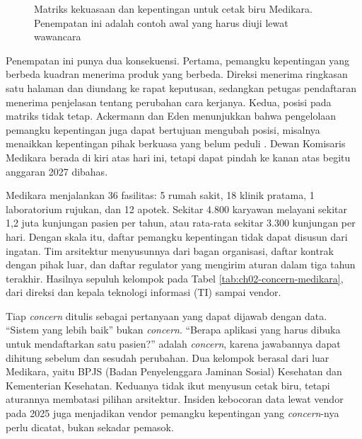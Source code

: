 \begin{figure}[!htb]
  \centering
  
  \caption{Matriks kekuasaan dan kepentingan untuk cetak biru Medikara.
           Penempatan ini adalah contoh awal yang harus diuji lewat
           wawancara}
  \label{fig:ch02-matriks-pemangku}
\end{figure}

Penempatan ini punya dua konsekuensi. Pertama, pemangku kepentingan yang
berbeda kuadran menerima produk yang berbeda. Direksi menerima ringkasan satu
halaman dan diundang ke rapat keputusan, sedangkan petugas pendaftaran
menerima penjelasan tentang perubahan cara kerjanya. Kedua, posisi pada
matriks tidak tetap. Ackermann dan Eden menunjukkan bahwa pengelolaan
pemangku kepentingan juga dapat bertujuan mengubah posisi, misalnya
menaikkan kepentingan pihak berkuasa yang belum peduli
\cite{c02-ackermann2011}. Dewan Komisaris Medikara berada di kiri atas hari
ini, tetapi dapat pindah ke kanan atas begitu anggaran 2027 dibahas.

\begin{kasus}[title={Kasus Medikara Health: Siapa Berkepentingan atas Cetak Biru}]
\setlength{\parskip}{0.4em}
Medikara menjalankan 36 fasilitas: 5 rumah sakit, 18 klinik pratama, 1
laboratorium rujukan, dan 12 apotek. Sekitar 4.800 karyawan melayani sekitar
1,2 juta kunjungan pasien per tahun, atau rata-rata sekitar 3.300 kunjungan
per hari. Dengan skala itu, daftar pemangku kepentingan tidak dapat disusun
dari ingatan. Tim arsitektur menyusunnya dari bagan organisasi, daftar
kontrak dengan pihak luar, dan daftar regulator yang mengirim aturan dalam
tiga tahun terakhir. Hasilnya sepuluh kelompok pada
Tabel \ref{tab:ch02-concern-medikara}, dari direksi dan kepala teknologi
informasi (TI) sampai vendor.

Tiap \textit{concern} ditulis sebagai pertanyaan yang dapat dijawab dengan
data. ``Sistem yang lebih baik'' bukan \textit{concern}. ``Berapa aplikasi
yang harus dibuka untuk mendaftarkan satu pasien?'' adalah \textit{concern},
karena jawabannya dapat dihitung sebelum dan sesudah perubahan. Dua kelompok
berasal dari luar Medikara, yaitu BPJS (Badan Penyelenggara Jaminan Sosial)
Kesehatan dan Kementerian Kesehatan. Keduanya tidak ikut menyusun cetak biru,
tetapi aturannya membatasi pilihan arsitektur. Insiden kebocoran data lewat
vendor pada 2025 juga menjadikan vendor pemangku kepentingan yang
\textit{concern}-nya perlu dicatat, bukan sekadar pemasok.
\end{kasus}


